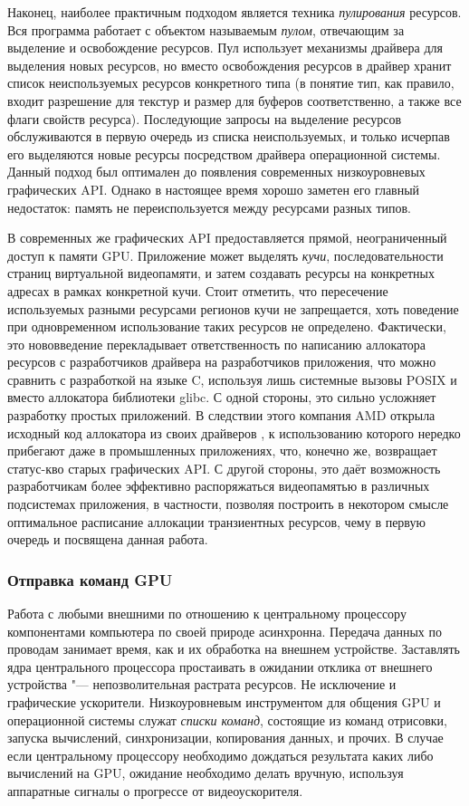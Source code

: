 Наконец, наиболее практичным подходом является техника \textit{пулирования} ресурсов.
Вся программа работает с объектом называемым \textit{пулом}, отвечающим за выделение и освобождение ресурсов.
Пул использует механизмы драйвера для выделения новых ресурсов, но вместо освобождения ресурсов в драйвер хранит список неиспользуемых ресурсов конкретного типа (в понятие тип, как правило, входит разрешение для текстур и размер для буферов соответственно, а также все флаги свойств ресурса).
Последующие запросы на выделение ресурсов обслуживаются в первую очередь из списка неиспользуемых, и только исчерпав его выделяются новые ресурсы посредством драйвера операционной системы.
Данный подход был оптимален до появления современных низкоуровневых графических API.
Однако в настоящее время хорошо заметен его главный недостаток: память не переиспользуется между ресурсами разных типов.

В современных же графических API предоставляется прямой, неограниченный доступ к памяти GPU.
Приложение может выделять \textit{кучи}, последовательности страниц виртуальной видеопамяти, и затем создавать ресурсы на конкретных адресах в рамках конкретной кучи.
Стоит отметить, что пересечение используемых разными ресурсами регионов кучи не запрещается, хоть поведение при одновременном использование таких ресурсов не определено.
Фактически, это нововведение перекладывает ответственность по написанию аллокатора ресурсов с разработчиков драйвера на разработчиков приложения, что можно сравнить с разработкой на языке C, используя лишь системные вызовы POSIX  и  вместо аллокатора библиотеки glibc.
С одной стороны, это сильно усложняет разработку простых приложений.
В следствии этого компания AMD открыла исходный код аллокатора из своих драйверов \cite{VMA}, к использованию которого нередко прибегают даже в промышленных приложениях, что, конечно же, возвращает статус-кво старых графических API.
С другой стороны, это даёт возможность разработчикам более эффективно распоряжаться видеопамятью в различных подсистемах приложения, в частности, позволяя построить в некотором смысле оптимальное расписание аллокации транзиентных ресурсов, чему в первую очередь и посвящена данная работа.

\subsubsection{Отправка команд GPU}
Работа с любыми внешними по отношению к центральному процессору компонентами компьютера по своей природе асинхронна.
Передача данных по проводам занимает время, как и их обработка на внешнем устройстве.
Заставлять ядра центрального процессора простаивать в ожидании отклика от внешнего устройства "--- непозволительная растрата ресурсов.
Не исключение и графические ускорители.
Низкоуровневым инструментом для общения GPU и операционной системы служат \textit{списки команд}, состоящие из команд отрисовки, запуска вычислений, синхронизации, копирования данных, и прочих.
В случае если центральному процессору необходимо дождаться результата каких либо вычислений на GPU, ожидание необходимо делать вручную, используя аппаратные сигналы о прогрессе от видеоускорителя.

